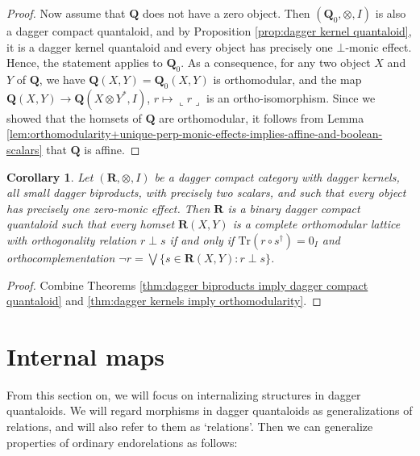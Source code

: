 \documentclass[12pt]{tac}
\newtheorem{corollary}[theorem]{Corollary}
\theoremstyle{definition}
\theoremstyle{remark}
\newcommand{\<}{\langle}
\renewcommand{\>}{\rangle}
\renewcommand{\:}{\colon}
\newcommand{\Tr}{\mathrm{Tr}}
\newcommand{\coname}[1]{\llcorner #1\lrcorner}
\begin{document}
\begin{proof}
Now assume that $\mathbf Q$ does not have a zero object. Then $(\mathbf Q_0,\otimes,I)$ is also a dagger compact quantaloid, and by Proposition \ref{prop:dagger kernel quantaloid}, it is a dagger kernel quantaloid and every object has precisely one $\bot$-monic effect. Hence, the statement applies to $\mathbf Q_0$. As a consequence, for any two object $X$ and $Y$ of $\mathbf Q$, we have $\mathbf Q(X,Y)=\mathbf Q_0(X,Y)$ is orthomodular, and the map $\mathbf Q(X,Y)\to\mathbf Q(X\otimes Y^*,I)$, $r\mapsto\coname r$ is an ortho-isomorphism. Since we showed that the homsets of $\mathbf Q$ are orthomodular, it follows from Lemma \ref{lem:orthomodularity+unique-perp-monic-effects-implies-affine-and-boolean-scalars} that $\mathbf Q$ is affine.
\end{proof}

\begin{corollary}\label{cor:orthomodular quantaloid}
    Let $(\mathbf R,\otimes,I)$ be a dagger compact category with dagger kernels, all small dagger biproducts, with precisely two scalars, and such that every object has precisely one zero-monic effect. Then $\mathbf R$ is a binary dagger compact quantaloid such that every homset $\mathbf R(X,Y)$ is a complete orthomodular lattice with orthogonality relation $r\perp s$ if and only if $\Tr(r\circ s^\dag)=0_I$ and orthocomplementation $\neg r=\bigvee\{s\in\mathbf R(X,Y):r\perp s\}$.
\end{corollary}
\begin{proof}
    Combine Theorems \ref{thm:dagger biproducts imply dagger compact quantaloid} and \ref{thm:dagger kernels imply orthomodularity}.
\end{proof}




\section{Internal maps}\label{sec:internal maps}

From this section on, we will focus on internalizing structures in dagger quantaloids. We will regard morphisms in dagger quantaloids as generalizations of relations, and will also refer to them as `relations'. Then we can generalize properties of ordinary endorelations as follows:
\end{document}
